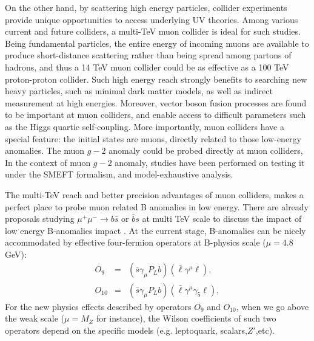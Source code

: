 \documentclass[a4paper,11pt]{article}
\begin{document}
On the other hand, by scattering high energy particles,
collider experiments provide unique opportunities to access underlying UV theories.
Among various current and future colliders\cite{Shiltsev:2019rfl},
a multi-TeV muon collider\cite{Aime:2022flm,MuonCollider:2022xlm} is ideal for such studies.
Being fundamental particles, the entire energy of incoming muons are available to produce short-distance scattering rather than being spread among partons of hadrons,
and thus a 14 TeV muon collider could be as effective as a 100 TeV proton-proton collider\cite{Delahaye:2019omf}.
Such high energy reach strongly benefits to searching new heavy particles, such as minimal dark matter models\cite{Han:2020uak,Bottaro:2021snn},
as well as indirect measurement at high energies\cite{Buttazzo:2020uzc}.
Moreover, vector boson fusion processes are found to be important at muon colliders\cite{Costantini:2020stv},
and enable access to difficult parameters such as the Higgs quartic self-coupling\cite{Chiesa:2020awd}.
More importantly, muon colliders have a special feature: the initial states are muons, directly related to those low-energy anomalies. The muon $g-2$ anomaly could be probed directly at muon colliders\cite{Buttazzo:2020ibd},
In the context of muon $g-2$ anomaly, studies have been performed on testing it under the SMEFT formalism\cite{Buttazzo:2020ibd}, and model-exhaustive analysis\cite{Buttazzo:2020ibd,Capdevilla:2020qel,Capdevilla:2021rwo,Capdevilla:2021kcf}.

 The multi-TeV reach and better precision advantages of muon colliders, makes a perfect place to probe muon related B anomalies in low energy. There are already proposals studying $\mu^+\mu^-\to b\bar{s}$ or $\bar{b}s$ at multi TeV scale to discuss the impact of low energy B-anomalies impact \cite{Altmannshofer:2022xri,Huang:2021nkl}. At the current stage, B-anomalies can be nicely accommodated by effective four-fermion operators at B-physics scale ($\mu= 4.8$ GeV):
 \begin{eqnarray}
   O_9 &=& (\bar{s}\gamma_\mu P_L b)(\bar{\ell}\gamma^{\mu}\ell),  \\
   O_{10} &=& (\bar{s}\gamma_\mu P_L b)(\bar{\ell}\gamma^{\mu}\gamma_5\ell),
\end{eqnarray}
For the new physics effects described by operators $O_9$ and $O_{10}$, when we go above the weak scale ($\mu=M_Z$ for instance), the Wilson coefficients of such two operators depend on the specific models (e.g. leptoquark, scalars,$Z'$,etc). 
\end{document}
